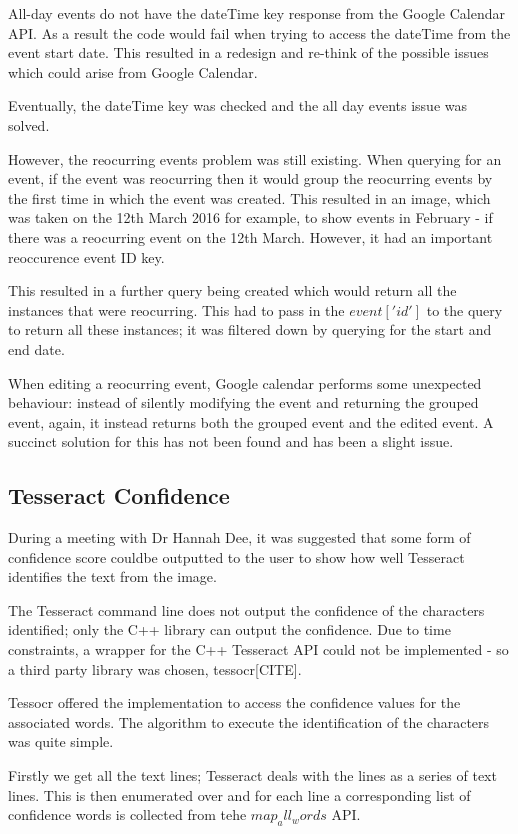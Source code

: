 All-day events do not have the dateTime key response from the Google Calendar API. As a result the code would fail when trying to access the dateTime from the event start date. This resulted in a redesign and re-think of the possible issues which could arise from Google Calendar.

Eventually, the dateTime key was checked and the all day events issue was solved.

However, the reocurring events problem was still existing. When querying for an event, if the event was reocurring then it would group the reocurring events by the first time in which the event was created. This resulted in an image, which was taken on the 12th March 2016 for example, to show events in February - if there was a reocurring event on the 12th March. However, it had an important reoccurence event ID key.

This resulted in a further query being created which would return all the instances that were reocurring. This had to pass in the $event['id']$ to the query to return all these instances; it was filtered down by querying for the start and end date.

When editing a reocurring event, Google calendar performs some unexpected behaviour: instead of silently modifying the event and returning the grouped event, again, it instead returns both the grouped event and the edited event. A succinct solution for this has not been found and has been a slight issue.

\subsection{Tesseract Confidence}
During a meeting with Dr Hannah Dee, it was suggested that some form of confidence score couldbe outputted to the user to show how well Tesseract identifies the text from the image.

The Tesseract command line does not output the confidence of the characters identified; only the C++ library can output the confidence. Due to time constraints, a wrapper for the C++ Tesseract API could not be implemented - so a third party library was chosen, tessocr[CITE].

Tessocr offered the implementation to access the confidence values for the associated words. The algorithm to execute the identification of the characters was quite simple.

Firstly we get all the text lines; Tesseract deals with the lines as a series of text lines. This is then enumerated over and for each line a corresponding list of confidence words is collected from tehe $map_all_words$ API.

